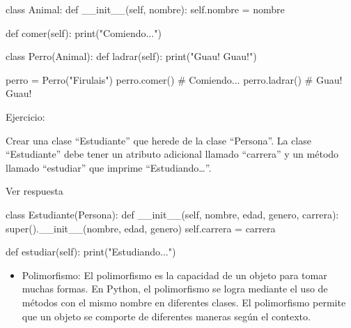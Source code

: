 \documentclass[
  a4paper,
  DIV=11,
  numbers=noendperiod,
  onepage,
  openany]{scrreprt}
\newenvironment{Shaded}{\begin{snugshade}}{\end{snugshade}}
\newcommand{\BuiltInTok}[1]{\textcolor[rgb]{0.00,0.23,0.31}{#1}}
\newcommand{\CommentTok}[1]{\textcolor[rgb]{0.37,0.37,0.37}{#1}}
\newcommand{\FunctionTok}[1]{\textcolor[rgb]{0.28,0.35,0.67}{#1}}
\newcommand{\KeywordTok}[1]{\textcolor[rgb]{0.00,0.23,0.31}{#1}}
\newcommand{\NormalTok}[1]{\textcolor[rgb]{0.00,0.23,0.31}{#1}}
\newcommand{\OperatorTok}[1]{\textcolor[rgb]{0.37,0.37,0.37}{#1}}
\newcommand{\StringTok}[1]{\textcolor[rgb]{0.13,0.47,0.30}{#1}}
\newcommand{\VariableTok}[1]{\textcolor[rgb]{0.07,0.07,0.07}{#1}}
\providecommand{\tightlist}{%
  \setlength{\itemsep}{0pt}\setlength{\parskip}{0pt}}\usepackage{longtable,booktabs,array}
\begin{document}
\begin{Shaded}
\begin{Highlighting}[]
\KeywordTok{class}\NormalTok{ Animal:}
    \KeywordTok{def} \FunctionTok{\_\_init\_\_}\NormalTok{(}\VariableTok{self}\NormalTok{, nombre):}
        \VariableTok{self}\NormalTok{.nombre }\OperatorTok{=}\NormalTok{ nombre}

    \KeywordTok{def}\NormalTok{ comer(}\VariableTok{self}\NormalTok{):}
        \BuiltInTok{print}\NormalTok{(}\StringTok{"Comiendo..."}\NormalTok{)}

\KeywordTok{class}\NormalTok{ Perro(Animal):}
    \KeywordTok{def}\NormalTok{ ladrar(}\VariableTok{self}\NormalTok{):}
        \BuiltInTok{print}\NormalTok{(}\StringTok{"Guau! Guau!"}\NormalTok{)}

\NormalTok{perro }\OperatorTok{=}\NormalTok{ Perro(}\StringTok{"Firulais"}\NormalTok{)}
\NormalTok{perro.comer()  }\CommentTok{\# Comiendo...}
\NormalTok{perro.ladrar()  }\CommentTok{\# Guau! Guau!}
\end{Highlighting}
\end{Shaded}

Ejercicio:

Crear una clase ``Estudiante'' que herede de la clase ``Persona''. La
clase ``Estudiante'' debe tener un atributo adicional llamado
``carrera'' y un método llamado ``estudiar'' que imprime
``Estudiando\ldots{}''.

Ver respuesta

\begin{Shaded}
\begin{Highlighting}[]
\KeywordTok{class}\NormalTok{ Estudiante(Persona):}
    \KeywordTok{def} \FunctionTok{\_\_init\_\_}\NormalTok{(}\VariableTok{self}\NormalTok{, nombre, edad, genero, carrera):}
        \BuiltInTok{super}\NormalTok{().}\FunctionTok{\_\_init\_\_}\NormalTok{(nombre, edad, genero)}
        \VariableTok{self}\NormalTok{.carrera }\OperatorTok{=}\NormalTok{ carrera}

    \KeywordTok{def}\NormalTok{ estudiar(}\VariableTok{self}\NormalTok{):}
        \BuiltInTok{print}\NormalTok{(}\StringTok{"Estudiando..."}\NormalTok{)}
\end{Highlighting}
\end{Shaded}

\begin{itemize}
\tightlist
\item
  Polimorfismo: El polimorfismo es la capacidad de un objeto para tomar
  muchas formas. En Python, el polimorfismo se logra mediante el uso de
  métodos con el mismo nombre en diferentes clases. El polimorfismo
  permite que un objeto se comporte de diferentes maneras según el
  contexto.
\end{itemize}
\end{document}
